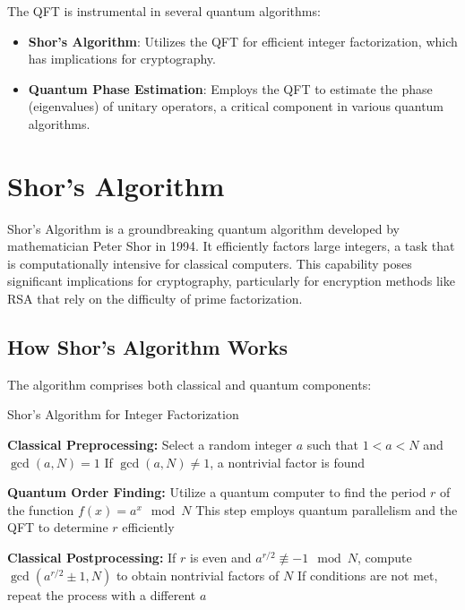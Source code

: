 \documentclass{article}
\begin{document}
The QFT is instrumental in several quantum algorithms:

\begin{itemize}
    \item \textbf{Shor's Algorithm}: Utilizes the QFT for efficient integer factorization, which has implications for cryptography.
    \item \textbf{Quantum Phase Estimation}: Employs the QFT to estimate the phase (eigenvalues) of unitary operators, a critical component in various quantum algorithms.
\end{itemize}

\section{Shor's Algorithm}

\begin{successbox}[title=Quantum Advantage]
    Shor's Algorithm is a groundbreaking quantum algorithm developed by mathematician Peter Shor in 1994. It efficiently factors large integers, a task that is computationally intensive for classical computers. This capability poses significant implications for cryptography, particularly for encryption methods like RSA that rely on the difficulty of prime factorization.
\end{successbox}

\subsection{How Shor's Algorithm Works}

The algorithm comprises both classical and quantum components:

\begin{algorithm}[H]
    \caption{Shor's Algorithm for Integer Factorization}
    \begin{algorithmic}[1]
        \State \textbf{Classical Preprocessing:}
        \State \hspace{0.5cm} Select a random integer $a$ such that $1 < a < N$ and $\gcd(a, N) = 1$
        \State \hspace{0.5cm} If $\gcd(a, N) \neq 1$, a nontrivial factor is found

        \State \textbf{Quantum Order Finding:}
        \State \hspace{0.5cm} Utilize a quantum computer to find the period $r$ of the function $f(x) = a^x \mod N$
        \State \hspace{0.5cm} This step employs quantum parallelism and the QFT to determine $r$ efficiently

        \State \textbf{Classical Postprocessing:}
        \State \hspace{0.5cm} If $r$ is even and $a^{r/2} \not\equiv -1 \mod N$, compute $\gcd(a^{r/2} \pm 1, N)$ to obtain nontrivial factors of $N$
        \State \hspace{0.5cm} If conditions are not met, repeat the process with a different $a$
    \end{algorithmic}
\end{algorithm}
\end{document}
